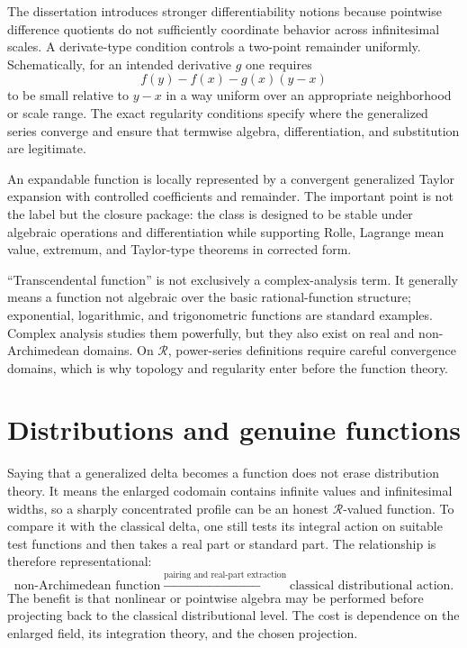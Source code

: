 \documentclass[11pt,a4paper]{article}
\theoremstyle{remark}
\newcommand{\LC}{\mathcal R}
\begin{document}
The dissertation introduces stronger differentiability notions because pointwise difference
quotients do not sufficiently coordinate behavior across infinitesimal scales. A derivate-type
condition controls a two-point remainder uniformly. Schematically, for an intended derivative
$g$ one requires
\[
f(y)-f(x)-g(x)(y-x)
\]
to be small relative to $y-x$ in a way uniform over an appropriate neighborhood or scale range.
The exact regularity conditions specify where the generalized series converge and ensure that
termwise algebra, differentiation, and substitution are legitimate.

An expandable function is locally represented by a convergent generalized Taylor expansion with
controlled coefficients and remainder. The important point is not the label but the closure
package: the class is designed to be stable under algebraic operations and differentiation while
supporting Rolle, Lagrange mean value, extremum, and Taylor-type theorems in corrected form.

``Transcendental function'' is not exclusively a complex-analysis term. It generally means a
function not algebraic over the basic rational-function structure; exponential, logarithmic, and
trigonometric functions are standard examples. Complex analysis studies them powerfully, but they
also exist on real and non-Archimedean domains. On $\LC$, power-series definitions require careful
convergence domains, which is why topology and regularity enter before the function theory.

\section{Distributions and genuine functions}

Saying that a generalized delta becomes a function does not erase distribution theory. It means
the enlarged codomain contains infinite values and infinitesimal widths, so a sharply concentrated
profile can be an honest $\LC$-valued function. To compare it with the classical delta, one still
tests its integral action on suitable test functions and then takes a real part or standard part.
The relationship is therefore representational:
\[
\text{non-Archimedean function}
\xrightarrow{\text{pairing and real-part extraction}}
\text{classical distributional action}.
\]
The benefit is that nonlinear or pointwise algebra may be performed before projecting back to the
classical distributional level. The cost is dependence on the enlarged field, its integration
theory, and the chosen projection.
\end{document}
